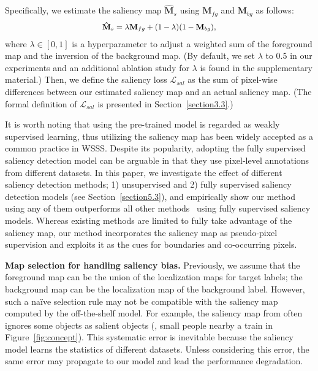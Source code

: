 \documentclass[final]{cvpr}
\begin{document}
Specifically, we estimate the saliency map $\mathbf{\hat{M}}_{s}$ using $\mathbf{M}_{fg}$ and $\mathbf{M}_{bg}$ as follows:\vspace{-1mm}
\begin{equation}
\label{eq_esimate_sal}
{\small
\begin{split}
\mathbf{\hat{M}}_{s} = \lambda\mathbf{M}_{fg} + (1-\lambda)(1-\mathbf{M}_{bg}),
\end{split}}\vspace{-1mm}
\end{equation}
\noindent where $\lambda \in [0, 1]$ is a hyperparameter to adjust a weighted sum of the foreground map and the inversion of the background map. (By default, we set $\lambda$ to 0.5 in our experiments and an additional ablation study for $\lambda$ is found in the supplementary material.) Then, we define the saliency loss $\mathcal{L}_{sal}$ as the sum of pixel-wise differences between our estimated saliency map and an actual saliency map. (The formal definition of $\mathcal{L}_{sal}$ is presented in Section~\ref{section3.3}.)

It is worth noting that using the pre-trained model is regarded as weakly supervised learning, thus utilizing the saliency map has been widely accepted as a common practice in WSSS. Despite its popularity, adopting the fully supervised saliency detection model can be arguable in that they use pixel-level annotations from different datasets. In this paper, we investigate the effect of different saliency detection methods; 1) unsupervised and 2) fully supervised saliency detection models (see Section~\ref{section5.3}), and empirically show our method using any of them outperforms all other methods~\cite{fan2020learning,jiang2019integral,wang2018weakly, wei2016stc,yao2020saliency} using fully supervised saliency models. Whereas existing methods are limited to fully take advantage of the saliency map, our method incorporates the saliency map as pseudo-pixel supervision and exploits it as the cues for boundaries and co-occurring pixels.

\vspace{1mm}
\noindent\textbf{Map selection for handling saliency bias.} Previously, we assume that the foreground map can be the union of the localization maps for target labels; the background map can be the localization map of the background label. However, such a na\"ive selection rule may not be compatible with the saliency map computed by the off-the-shelf model. For example, the saliency map from \cite{zhao2019pyramid} often ignores some objects as salient objects (\eg, small people nearby a train in Figure~\ref{fig:concept}). This systematic error is inevitable because the saliency model learns the statistics of different datasets. Unless considering this error, the same error may propagate to our model and lead the performance degradation. 
\end{document}
